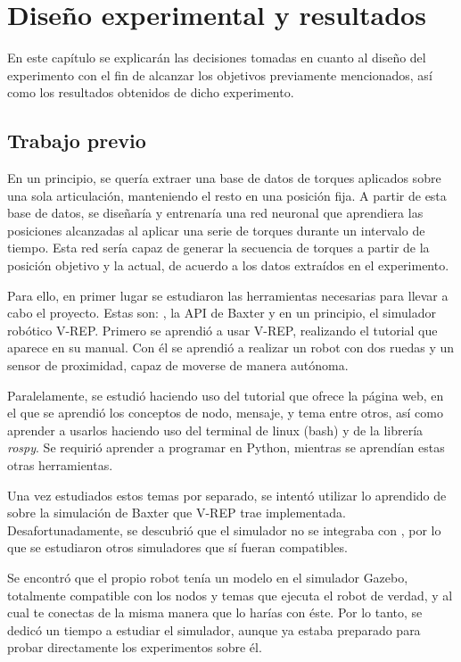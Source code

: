 \chapter{Diseño experimental y resultados}
En este capítulo se explicarán las decisiones tomadas en cuanto al diseño del experimento con el fin de alcanzar los objetivos previamente mencionados, así como los resultados obtenidos de dicho experimento.
\section{Trabajo previo}
En un principio, se quería extraer una base de datos de torques aplicados sobre una sola articulación, manteniendo el resto en una posición fija. A partir de esta base de datos, se diseñaría y entrenaría una red neuronal que aprendiera las posiciones alcanzadas al aplicar una serie de torques durante un intervalo de tiempo. Esta red sería capaz de generar la secuencia de torques a partir de la posición objetivo y la actual, de acuerdo a los datos extraídos en el experimento.

Para ello, en primer lugar se estudiaron las herramientas necesarias para llevar a cabo el proyecto. Estas son: \ros, la API de Baxter y en un principio, el simulador robótico V-REP. Primero se aprendió a usar V-REP, realizando el tutorial que aparece en su manual. Con él se aprendió a realizar un robot con dos ruedas y un sensor de proximidad, capaz de moverse de manera autónoma.

Paralelamente, se estudió \ros haciendo uso del tutorial que ofrece la página web, en el que se aprendió los conceptos de nodo, mensaje, y tema entre otros, así como aprender a usarlos haciendo uso del terminal de linux (bash) y de la librería \textit{rospy}. Se requirió aprender a programar en Python, mientras se aprendían estas otras herramientas.

Una vez estudiados estos temas por separado, se intentó utilizar lo aprendido de \ros sobre la simulación de Baxter que V-REP trae implementada. Desafortunadamente, se descubrió que el simulador no se integraba con \ros, por lo que se estudiaron otros simuladores que sí fueran compatibles.

Se encontró que el propio robot tenía un modelo en el simulador Gazebo, totalmente compatible con los nodos y temas que ejecuta el robot de verdad, y al cual te conectas de la misma manera que lo harías con éste. Por lo tanto, se dedicó un tiempo a estudiar el simulador, aunque ya estaba preparado para probar directamente los experimentos sobre él.


